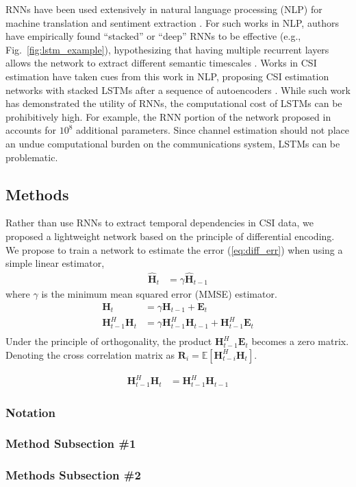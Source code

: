 RNNs have been used extensively in natural language processing (NLP) for machine translation \cite{ref:Sutskever2014seq2seq} and sentiment extraction \cite{ref:Irsoy2014opinion}. For such works in NLP, authors have empirically found ``stacked'' or ``deep'' RNNs to be effective (e.g., Fig.~\ref{fig:lstm_example}), hypothesizing that having multiple recurrent layers allows the network to extract different semantic timescales \cite{ref:Irsoy2014opinion, ref:Bengio2009Learning}. Works in CSI estimation have taken cues from this work in NLP, proposing CSI estimation networks with stacked LSTMs after a sequence of autoencoders \cite{ref:Wang2019CsiNetLSTM}. While such work has demonstrated the utility of RNNs, the computational cost of LSTMs can be prohibitively high. For example, the RNN portion of the network proposed in \cite{ref:Wang2019CsiNetLSTM} accounts for $10^8$ additional parameters. Since channel estimation should not place an undue computational burden on the communications system, LSTMs can be problematic.

\subsection{Methods}

Rather than use RNNs to extract temporal dependencies in CSI data, we proposed a lightweight network based on the principle of differential encoding. We propose to train a network to estimate the error (\ref{eq:diff_err}) when using a simple linear estimator,
\begin{align*}
\hat{\mathbf H}_t &= \gamma \hat{\mathbf H}_{t-1} 
\end{align*}
where $\gamma$ is the minimum mean squared error (MMSE) estimator.
\begin{align*}
\mathbf H_t &= \gamma\mathbf H_{t-1} + \mathbf E_t \\
\mathbf H_{t-1}^H\mathbf H_t &= \gamma\mathbf H_{t-1}^H\mathbf H_{t-1} + \mathbf H_{t-1}^H\mathbf E_t \\
\end{align*}
Under the principle of orthogonality, the product $\mathbf H^H_{t-1}\mathbf E_t$ becomes a zero matrix. Denoting the cross correlation matrix as $\mathbf R_{i} = \mathbb{E}\left[\mathbf H_{t-i}^H\mathbf H_{t}\right]$.

\begin{align*}
\mathbf H_{t-1}^H\mathbf H_t &= \mathbf H_{t-1}^H\mathbf H_{t-1} 
\end{align*}

\subsubsection{Notation}

\subsubsection{Method Subsection \#1}
\label{sect:methods_sub1}

\subsubsection{Methods Subsection \#2}
\label{sect:methods_sub2}

